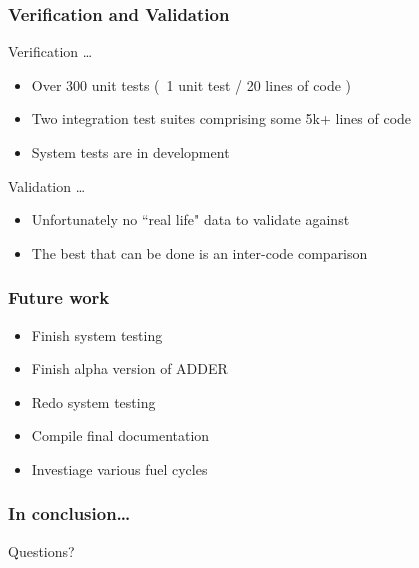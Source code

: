 \documentclass{beamer}
\begin{document}
\begin{frame}
\frametitle{Verification and Validation}

    Verification \ldots

    \hspace{1cm}

    \begin{itemize}
        \item Over 300 unit tests (~1 unit test / 20 lines of code )
        \item Two integration test suites comprising some 5k+ lines of code
        \item System tests are in development
    \end{itemize}

    \hspace{2cm}

    Validation \ldots

    \hspace{1cm}

    \begin{itemize}
        \item Unfortunately no ``real life" data to validate against
        \item The best that can be done is an inter-code comparison
    \end{itemize}

\end{frame}

\begin{frame}
\frametitle{Future work}

    \begin{itemize}

        \item Finish system testing
        \item Finish alpha version of ADDER
        \item Redo system testing
        \item Compile final documentation
        \item Investiage various fuel cycles

    \end{itemize}

\end{frame}

\begin{frame}
\frametitle{In conclusion\ldots}

    Questions?

\end{frame}
\end{document}
